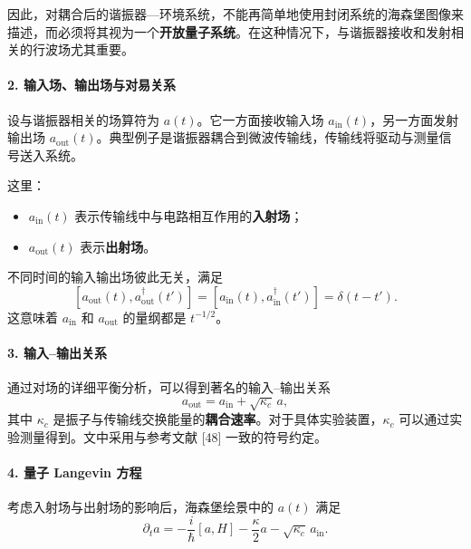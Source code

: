 \documentclass[12pt,a4paper,oneside]{ctexbook}
\begin{document}
因此，对耦合后的谐振器---环境系统，不能再简单地使用封闭系统的海森堡图像来描述，而必须将其视为一个\textbf{开放量子系统}。在这种情况下，与谐振器接收和发射相关的行波场尤其重要。

\paragraph{2. 输入场、输出场与对易关系}

设与谐振器相关的场算符为 \(a(t)\)。它一方面接收输入场 \(a_{\mathrm{in}}(t)\)，另一方面发射输出场 \(a_{\mathrm{out}}(t)\)。典型例子是谐振器耦合到微波传输线，传输线将驱动与测量信号送入系统。

这里：
\begin{itemize}[leftmargin=2em]
    \item \(a_{\mathrm{in}}(t)\) 表示传输线中与电路相互作用的\textbf{入射场}；
    \item \(a_{\mathrm{out}}(t)\) 表示\textbf{出射场}。
\end{itemize}

不同时间的输入输出场彼此无关，满足
\[
    [a_{\mathrm{out}}(t),a_{\mathrm{out}}^\dagger(t')]
    =
    [a_{\mathrm{in}}(t),a_{\mathrm{in}}^\dagger(t')]
    =
    \delta(t-t').
\]
这意味着 \(a_{\mathrm{in}}\) 和 \(a_{\mathrm{out}}\) 的量纲都是 \(t^{-1/2}\)。

\paragraph{3. 输入--输出关系}

通过对场的详细平衡分析，可以得到著名的输入--输出关系
\begin{equation}
    a_{\mathrm{out}}=a_{\mathrm{in}}+\sqrt{\kappa_c}\,a,
    \tag{8}
\end{equation}
其中 \(\kappa_c\) 是振子与传输线交换能量的\textbf{耦合速率}。对于具体实验装置，\(\kappa_c\) 可以通过实验测量得到。文中采用与参考文献 [48] 一致的符号约定。

\paragraph{4. 量子 Langevin 方程}

考虑入射场与出射场的影响后，海森堡绘景中的 \(a(t)\) 满足
\begin{equation}
    \partial_t a
    =
    -\frac{i}{\hbar}[a,H]
    -\frac{\kappa}{2}a
    -\sqrt{\kappa_c}\,a_{\mathrm{in}}.
    \tag{9}
\end{equation}
\end{document}
